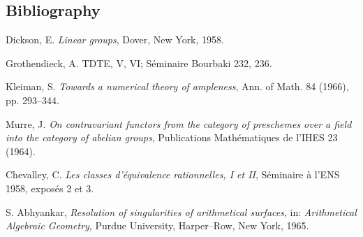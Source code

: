 \subsection*{Bibliography}
\begin{enumerate}[label={[\arabic*]}]
\item Dickson, E. \emph{Linear groups}, Dover, New York, 1958.
\item Grothendieck, A. TDTE, V, VI; S\'eminaire Bourbaki 232, 236.
\item Kleiman, S. \emph{Towards a numerical theory of ampleness}, Ann. of
  Math. 84 (1966), pp. 293--344.
\item Murre, J. \emph{On contravariant functors from the category of
  preschemes over a field into the category of abelian groups}, Publications
  Math\'ematiques de l'IHES 23 (1964).
\item Chevalley, C. \emph{Les classes d'\'equivalence rationnelles, I et II},
  S\'eminaire \`a l'ENS 1958, expos\'es 2 et 3.
\item S. Abhyankar, \emph{Resolution of singularities of arithmetical
  surfaces}, in: \emph{Arithmetical Algebraic Geometry}, Purdue University,
  Harper--Row, New York, 1965.
\end{enumerate}
